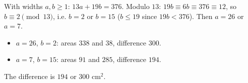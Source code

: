 With widths $a,b\ge1$: $13a+19b=376$. Modulo $13$: $19b\equiv6b\equiv376\equiv12$, so $b\equiv2\pmod{13}$, i.e. $b=2$ or $b=15$ ($b\le19$ since $19b<376$). Then $a=26$ or $a=7$.
\begin{itemize}
\item $a=26$, $b=2$: areas $338$ and $38$, difference $300$.
\item $a=7$, $b=15$: areas $91$ and $285$, difference $194$.
\end{itemize}
The difference is $\boxed{194\text{ or }300}$ cm$^2$.
